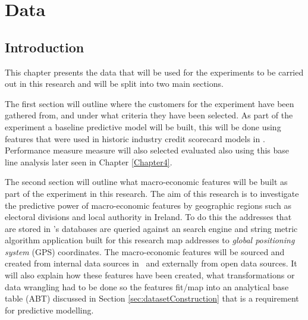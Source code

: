 
\chapter{Data} %

\label{Chapter3} %


\section{Introduction}
This chapter presents the data that will be used for the experiments to be carried out in this research and will be split into two main sections. 

The first section will outline where the customers for the experiment have been gathered from, and under what criteria they have been selected. As part of the experiment a baseline predictive model will be built, this will be done using features that were used in historic industry credit scorecard models in \subjectname. Performance measure measure will also selected evaluated also using this base line analysis later seen in Chapter \ref{Chapter4}.

The second section will outline what macro-economic features will be built as part of the experiment in this research. The aim of this research is to investigate the predictive power of macro-economic features by geographic regions such as electoral divisions and local authority in Ireland. To do this the addresses that are stored in \subjectname's databases are queried against an search engine and string metric algorithm application built for this research map addresses to \textit{global positioning system} (GPS) coordinates. The macro-economic features will be sourced and created from internal data sources in \subjectname\ and externally from open data sources. It will also explain how these features have been created, what transformations or data wrangling had to be done so the features fit/map into an analytical base table (ABT) discussed in Section \ref{sec:datasetConstruction} that is a requirement for predictive modelling.

